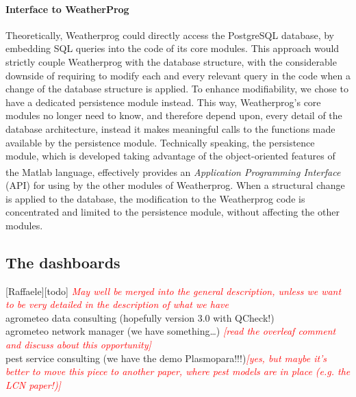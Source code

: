 \documentclass[authoryear,preprint,review,12pt]{elsarticle}
\newcommand{\note}[1]{\emph{\textcolor{red}{#1}}}
\begin{document}
\paragraph{Interface to WeatherProg}
Theoretically, Weatherprog could directly access the PostgreSQL database, by embedding SQL queries into the code of its core modules. This approach would strictly couple Weatherprog with the database structure, with the considerable downside of requiring to modify each and every relevant query in the code when a change of the database structure is applied. To enhance modifiability, we chose to have a dedicated persistence module instead. This way, Weatherprog's core modules no longer need to know, and therefore depend upon, every detail of the database architecture, instead it makes meaningful calls to the functions made available by the persistence module. Technically speaking, the persistence module, which is developed taking advantage of the object-oriented features of the Matlab\textsuperscript{\circledR} language, effectively provides an \emph{Application Programming Interface} (API) for using by the other modules of Weatherprog. When a structural change is applied to the database, the modification to the Weatherprog code is concentrated and limited to the persistence module, without affecting the other modules.

\subsection{The dashboards}[Raffaele][todo]
\note{May well be merged into the general description, unless we want to be very detailed in the description of what we have}\\
agrometeo data consulting (hopefully version 3.0 with QCheck!)\\
agrometeo network manager (we have something\ldots) \note{[read the overleaf comment and discuss about this opportunity]}\\
pest service consulting (we have the demo Plasmopara!!!)\note{[yes, but maybe it's better to move this piece to another paper, where pest models are in place (e.g. the LCN paper!)]}\\
\end{document}
